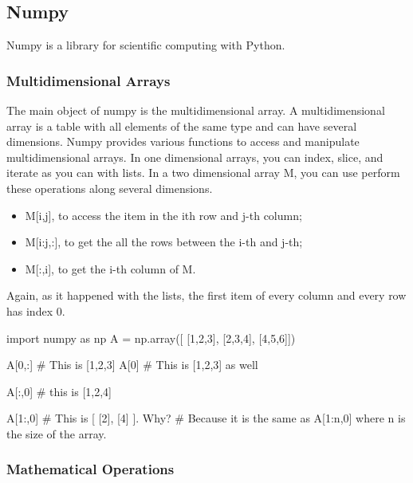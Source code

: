 
\subsection{Numpy}

Numpy is a library for scientific computing with Python.

\subsubsection{Multidimensional Arrays}

The main object of numpy is the multidimensional array. A multidimensional array is a table with all elements of the same type and can have several dimensions. Numpy provides various functions to access and manipulate multidimensional arrays. In one dimensional arrays, you can index, slice, and iterate as you can with lists. In a two dimensional array M, you can use perform these operations along several dimensions.

\begin{itemize}
 \item M[i,j], to access the item in the ith row and j-th column; 
 \item M[i:j,:], to get the all the rows between the i-th and j-th;
 \item M[:,i], to get the i-th column of M.
\end{itemize}

Again, as it happened with the lists, the first item of every column and every row has index 0.

\begin{python}
import numpy as np
A = np.array([
    [1,2,3],
    [2,3,4],
    [4,5,6]])

A[0,:] # This is [1,2,3]
A[0] # This is [1,2,3] as well

A[:,0] # this is [1,2,4]

A[1:,0] # This is [ [2], [4] ]. Why?
        # Because it is the same as A[1:n,0] where n is the size of the array.
\end{python}

\subsubsection{Mathematical Operations}

